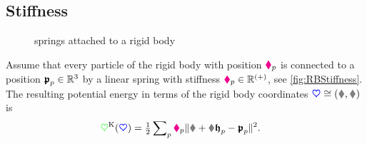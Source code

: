 \subsection{Stiffness}\label{sec:RBStiffness}
\begin{figure}[ht]
 \centering
 
 \caption{springs attached to a rigid body}
 \label{fig:RBStiffness}
\end{figure}
Assume that every particle of the rigid body with position $\boldsymbol{\textcolor{magenta}{\blacklozenge}}_{p}$ is connected to a position $\boldsymbol{\mathfrak{p}}_{p} \in \mathbb{R}^3$ by a linear spring with stiffness $\textcolor{magenta}{\blacklozenge}_{p} \in\mathbb{R}^{(+)}$, see \autoref{fig:RBStiffness}.
The resulting potential energy in terms of the rigid body coordinates $\sysCoord \cong (\r, \R)$ is
\begin{align}\label{eq:RBStiffnessPotential}
 \potentialStiff(\sysCoord) &= \tfrac{1}{2} \sumParticles \particleStiffness{\PidxI} \norm{\r + \R \particleBodyPos{\PidxI} - \springHubPos{\PidxI}}^2.
\end{align}


